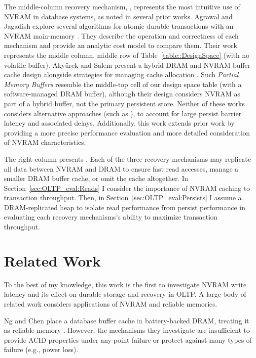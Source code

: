 The middle-column recovery mechanism, \InPlace, represents the most intuitive use of NVRAM in database systems, as noted in several prior works.
Agrawal and Jagadish explore several algorithms for atomic durable transactions with an NVRAM main-memory \cite{AgrawalJagadish89}.
They describe the operation and correctness of each mechanism and provide an analytic cost model to compare them.
Their work represents the middle column, middle row of Table~\ref{table::DesignSpace} (\InPlace with no volatile buffer).
Aky\"{u}rek and Salem present a hybrid DRAM and NVRAM buffer cache design alongside strategies for managing cache allocation \cite{SalemAkyrek95}.
Such \emph{Partial Memory Buffers} resemble the middle-top cell of our design space table (\InPlace with a software-managed DRAM buffer), although their design considers NVRAM as part of a hybrid buffer, not the primary persistent store.
Neither of these works considers alternative approaches (such as \GroupCommit), to account for large persist barrier latency and associated delays.
Additionally, this work extends prior work by providing a more precise performance evaluation and more detailed consideration of NVRAM characteristics.

The right column presents \GroupCommit.
Each of the three recovery mechanisms may replicate all data between NVRAM and DRAM to ensure fast read accesses, manage a smaller DRAM buffer cache, or omit the cache altogether.
In Section~\ref{sec:OLTP_eval:Reads} I consider the importance of NVRAM caching to transaction throughput.
Then, in Section~\ref{sec:OLTP_eval:Persists} I assume a DRAM-replicated heap to isolate read performance from persist performance in evaluating each recovery mechanisms's ability to maximize transaction throughput.

\section{Related Work}
\label{sec:OLTP_design:RelatedWork}
To the best of my knowledge, this work is the first to investigate NVRAM write latency and its effect on durable storage and recovery in OLTP.
A large body of related work considers applications of NVRAM and reliable memories.

Ng and Chen place a database buffer cache in battery-backed DRAM, treating it as reliable memory \cite{NgChen97}.
However, the mechanisms they investigate are insufficient to provide ACID properties under any-point failure or protect against many types of failure (e.g., power loss).

